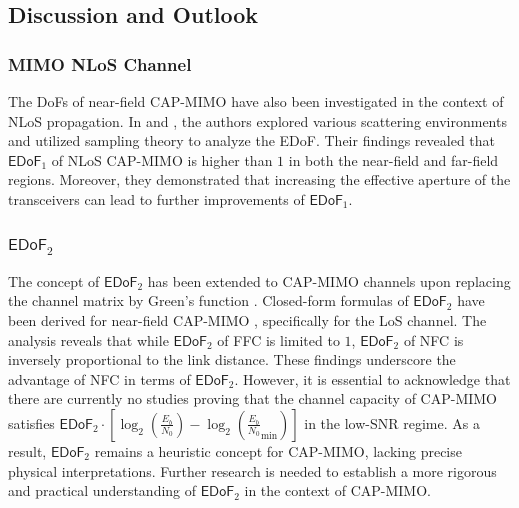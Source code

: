\documentclass[journal]{IEEEtran}
\theoremstyle{definition}
\begin{document}
%





\subsection{Discussion and Outlook}
\subsubsection{MIMO NLoS Channel}
The DoFs of near-field CAP-MIMO have also been investigated in the context of NLoS propagation. In \cite{Poon2005} and \cite{Pizzo2023}, the authors explored various scattering environments and utilized sampling theory to analyze the EDoF. Their findings revealed that $\mathsf{EDoF}_1$ of NLoS CAP-MIMO is higher than $1$ in both the near-field and far-field regions. Moreover, they demonstrated that increasing the effective aperture of the transceivers can lead to further improvements of $\mathsf{EDoF}_1$.
\subsubsection{${\mathsf{EDoF}}_2$}
The concept of $\mathsf{EDoF}_2$ has been extended to CAP-MIMO channels upon replacing the channel matrix by Green's function \cite[Eqn. (8)]{Jiang2023}. Closed-form formulas of $\mathsf{EDoF}_2$ have been derived for near-field CAP-MIMO \cite{Xie2023,Jiang2023}, specifically for the LoS channel. The analysis reveals that while $\mathsf{EDoF}_2$ of FFC is limited to $1$, $\mathsf{EDoF}_2$ of NFC is inversely proportional to the link distance. These findings underscore the advantage of NFC in terms of $\mathsf{EDoF}_2$. However, it is essential to acknowledge that there are currently no studies proving that the channel capacity of CAP-MIMO satisfies ${\mathsf{EDoF}}_2\cdot[\log_2(\frac{E_b}{N_0})-\log_2({\frac{E_b}{N_0}}_{\min})]$ in the low-SNR regime. As a result, ${\mathsf{EDoF}}_2$ remains a heuristic concept for CAP-MIMO, lacking precise physical interpretations. Further research is needed to establish a more rigorous and practical understanding of ${\mathsf{EDoF}}_2$ in the context of CAP-MIMO.
\end{document}
